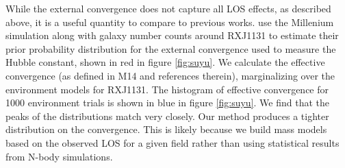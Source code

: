 While the external convergence does not capture all LOS effects, as described above, it is a useful quantity to compare to previous works. \citet{Suyu13} use the Millenium simulation along with galaxy number counts around RXJ1131 to estimate their prior probability distribution for the external convergence used to measure the Hubble constant, shown in red in figure \ref{fig:suyu}. We calculate the effective convergence (as defined in M14 and references therein), marginalizing over the environment models for RXJ1131. The histogram of effective convergence for 1000 environment trials is shown in blue in figure \ref{fig:suyu}. We find that the peaks of the distributions match very closely. Our method produces a tighter distribution on the convergence. This is likely because we build mass models based on the observed LOS for a given field rather than using statistical results from N-body simulations.